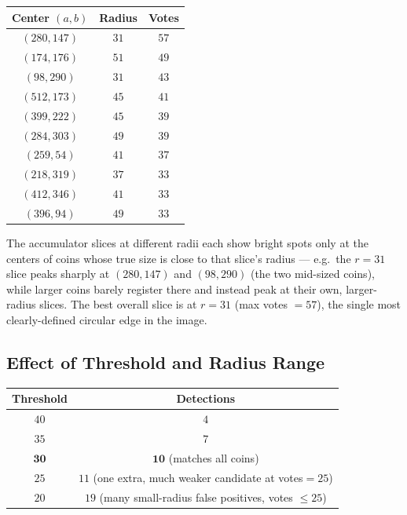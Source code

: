 \documentclass[11pt]{article}
\begin{document}
\begin{center}
\begin{tabular}{ccc}
\toprule
Center $(a,b)$ & Radius & Votes \\
\midrule
$(280,147)$ & $31$ & $57$ \\
$(174,176)$ & $51$ & $49$ \\
$(98,290)$  & $31$ & $43$ \\
$(512,173)$ & $45$ & $41$ \\
$(399,222)$ & $45$ & $39$ \\
$(284,303)$ & $49$ & $39$ \\
$(259,54)$  & $41$ & $37$ \\
$(218,319)$ & $37$ & $33$ \\
$(412,346)$ & $41$ & $33$ \\
$(396,94)$  & $49$ & $33$ \\
\bottomrule
\end{tabular}
\end{center}

The accumulator slices at different radii each show bright spots only at the centers of
coins whose true size is close to that slice's radius --- e.g.\ the $r=31$ slice peaks
sharply at $(280,147)$ and $(98,290)$ (the two mid-sized coins), while larger coins barely
register there and instead peak at their own, larger-radius slices. The best overall slice
is at $r=31$ (max votes $=57$), the single most clearly-defined circular edge in the image.

\subsection*{Effect of Threshold and Radius Range}

\begin{center}
\begin{tabular}{cc}
\toprule
Threshold & Detections \\
\midrule
$40$ & $4$ \\
$35$ & $7$ \\
$\mathbf{30}$ & $\mathbf{10}$ (matches all coins) \\
$25$ & $11$ (one extra, much weaker candidate at votes$=25$) \\
$20$ & $19$ (many small-radius false positives, votes $\leq 25$) \\
\bottomrule
\end{tabular}
\end{center}
\end{document}
